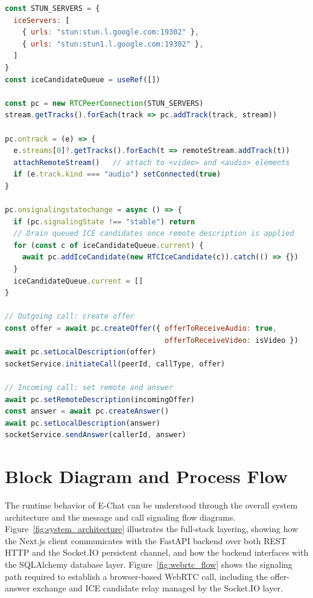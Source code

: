 \documentclass[12pt,a4paper,oneside]{report}
\begin{document}
\begin{lstlisting}[language=JavaScript, caption=WebRTC Setup and ICE Candidate Queuing (call-screen.tsx)]
const STUN_SERVERS = {
  iceServers: [
    { urls: "stun:stun.l.google.com:19302" },
    { urls: "stun:stun1.l.google.com:19302" },
  ]
}
const iceCandidateQueue = useRef([])

const pc = new RTCPeerConnection(STUN_SERVERS)
stream.getTracks().forEach(track => pc.addTrack(track, stream))

pc.ontrack = (e) => {
  e.streams[0]?.getTracks().forEach(t => remoteStream.addTrack(t))
  attachRemoteStream()   // attach to <video> and <audio> elements
  if (e.track.kind === "audio") setConnected(true)
}

pc.onsignalingstatechange = async () => {
  if (pc.signalingState !== "stable") return
  // Drain queued ICE candidates once remote description is applied
  for (const c of iceCandidateQueue.current) {
    await pc.addIceCandidate(new RTCIceCandidate(c)).catch(() => {})
  }
  iceCandidateQueue.current = []
}

// Outgoing call: create offer
const offer = await pc.createOffer({ offerToReceiveAudio: true,
                                     offerToReceiveVideo: isVideo })
await pc.setLocalDescription(offer)
socketService.initiateCall(peerId, callType, offer)

// Incoming call: set remote and answer
await pc.setRemoteDescription(incomingOffer)
const answer = await pc.createAnswer()
await pc.setLocalDescription(answer)
socketService.sendAnswer(callerId, answer)
\end{lstlisting}

\section{Block Diagram and Process Flow}
\label{sec:block-diagram}

The runtime behavior of E-Chat can be understood through the overall system
architecture and the message and call signaling flow diagrams.
Figure~\ref{fig:system_architecture} illustrates the full-stack layering,
showing how the Next.js client communicates with the FastAPI backend over both
REST HTTP and the Socket.IO persistent channel, and how the backend interfaces
with the SQLAlchemy database layer.
Figure~\ref{fig:webrtc_flow} shows the signaling path required to establish
a browser-based WebRTC call, including the offer-answer exchange and ICE
candidate relay managed by the Socket.IO layer.
\end{document}
